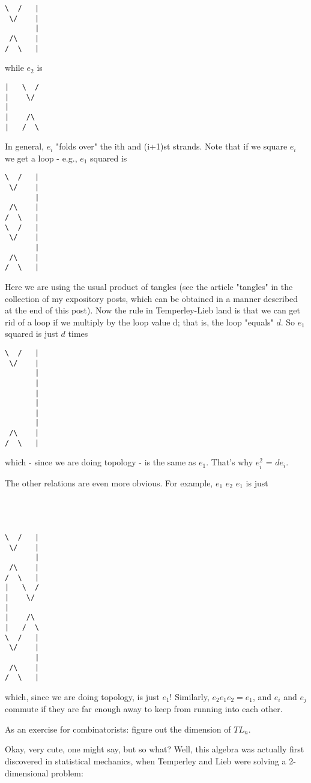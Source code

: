 \begin{verbatim}
\  /   |
 \/    |
       |
 /\    |
/  \   |

\end{verbatim}
while $e_2$ is
\begin{verbatim}
|   \  /  
|    \/   
|      
|    /\   
|   /  \  

\end{verbatim}
In general, $e_i$ "folds over" the ith and (i+1)st strands. Note that if we square $e_i$ we get a loop - e.g., $e_1$ squared is
\begin{verbatim}
\  /   |
 \/    |
       |
 /\    |
/  \   |
\  /   |
 \/    |
       |
 /\    |
/  \   |
\end{verbatim}
Here we are using the usual product of tangles (see the article "tangles" in the collection of my expository posts, which can be obtained in a manner described at the end of this post). Now the rule in Temperley-Lieb land is that we can get rid of a loop if we multiply by the loop value d; that is, the loop "equals" $d$. So $e_1$ squared is just $d$ times 
\begin{verbatim}
\  /   |
 \/    |
       |
       |
       |
       |
       |
       |
 /\    |
/  \   |

\end{verbatim}

which - since we are doing topology - is the same as $e_1$. That's why $e_i^2$ = $de_i$.

The other relations are even more obvious. For example, $e_1$ $e_2$ $e_1$ is just \\
\\
\\
\\

\begin{verbatim}
\  /   |
 \/    |
       |
 /\    |
/  \   |
|   \  /  
|    \/   
|      
|    /\   
|   /  \  
\  /   |
 \/    |
       |
 /\    |
/  \   |
\end{verbatim}
which, since we are doing topology, is just $e_1$! Similarly, $e_2 e_1 e_2 = e_1$, and $e_i$ and $e_j$ commute if they are far enough away to keep from running into each other.

As an exercise for combinatorists: figure out the dimension of $TL_n$.

Okay, very cute, one might say, but so what? Well, this algebra was actually first discovered in statistical mechanics, when Temperley and Lieb were solving a 2-dimensional problem:

